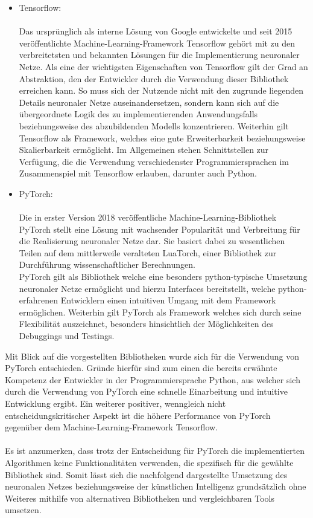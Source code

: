 \begin{itemize}
    \item Tensorflow:\\\\
    Das ursprünglich als interne Lösung von Google entwickelte und seit 2015 veröffentlichte Machine-Learning-Framework Tensorflow gehört mit zu den verbreitetsten und bekannten Lösungen für die Implementierung neuronaler Netze. Als eine der wichtigsten Eigenschaften von Tensorflow gilt der Grad an Abstraktion, den der Entwickler %
    durch die Verwendung dieser Bibliothek erreichen kann. So muss sich der Nutzende nicht mit den zugrunde liegenden Details neuronaler Netze auseinandersetzen, sondern kann sich auf die übergeordnete Logik des zu implementierenden Anwendungsfalls beziehungsweise des abzubildenden Modells konzentrieren. Weiterhin gilt Tensorflow als Framework, welches eine gute Erweiterbarkeit beziehungsweise Skalierbarkeit ermöglicht.
    Im Allgemeinen stehen Schnittstellen zur Verfügung, die die Verwendung verschiedenster Programmiersprachen im Zusammenspiel mit Tensorflow erlauben, darunter auch Python.
    \\
    \item PyTorch:\\\\
    Die in erster Version 2018 veröffentliche Machine-Learning-Bibliothek PyTorch stellt eine Lösung mit wachsender Popularität und Verbreitung für die Realisierung neuronaler Netze dar. Sie basiert dabei zu wesentlichen Teilen auf dem mittlerweile veralteten LuaTorch, einer Bibliothek zur Durchführung wissenschaftlicher Berechnungen.\\
    PyTorch gilt als Bibliothek welche eine besonders python-typische Umsetzung neuronaler Netze ermöglicht und hierzu Interfaces bereitstellt, welche python-erfahrenen Entwicklern einen intuitiven Umgang mit dem Framework ermöglichen. Weiterhin gilt PyTorch als Framework welches sich durch seine Flexibilität auszeichnet, besonders hinsichtlich der Möglichkeiten des Debuggings und Testings.
\end{itemize}
Mit Blick auf die vorgestellten Bibliotheken wurde sich für die Verwendung von PyTorch entschieden. Gründe hierfür sind zum einen die bereits erwähnte Kompetenz der Entwickler in der Programmiersprache Python, aus welcher sich durch die Verwendung von PyTorch eine schnelle Einarbeitung und intuitive Entwicklung ergibt. Ein weiterer positiver, wenngleich nicht entscheidungskritischer Aspekt ist die höhere Performance von PyTorch gegenüber dem Machine-Learning-Framework Tensorflow.\\\\
Es ist anzumerken, dass trotz der Entscheidung für PyTorch die implementierten Algorithmen keine Funktionalitäten verwenden, die spezifisch für die gewählte Bibliothek sind. Somit lässt sich die nachfolgend dargestellte Umsetzung des neuronalen Netzes beziehungsweise der künstlichen Intelligenz grundsätzlich ohne Weiteres mithilfe von alternativen Bibliotheken und vergleichbaren Tools umsetzen.

